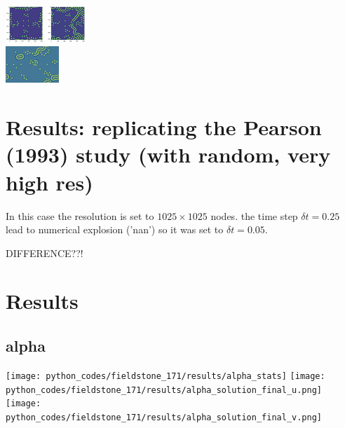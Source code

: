 \begin{itemize}
\includegraphics[height=1.4cm]{python_codes/fieldstone_171/pearson93_hr/pi_solution_0075000_u.png}
\includegraphics[height=1.4cm]{python_codes/fieldstone_171/pearson93_hr/pi_solution_final_u.png}\\
\includegraphics[height=1.4cm]{python_codes/fieldstone_171/images/munafo_pi}

\end{itemize}


\section*{Results: replicating the Pearson (1993) study (with random, very high res)}

In this case the resolution is set to $1025\times 1025$ nodes.
the time step $\delta t=0.25$ lead to numerical explosion ('nan') so 
it was set to $\delta t=0.05$.

DIFFERENCE??!








\newpage
\section*{Results}

\subsection*{alpha}

\begin{center}
\texttt{[image: python\_codes/fieldstone\_171/results/alpha\_stats]}
\texttt{[image: python\_codes/fieldstone\_171/results/alpha\_solution\_final\_u.png]}
\texttt{[image: python\_codes/fieldstone\_171/results/alpha\_solution\_final\_v.png]}
\end{center}

